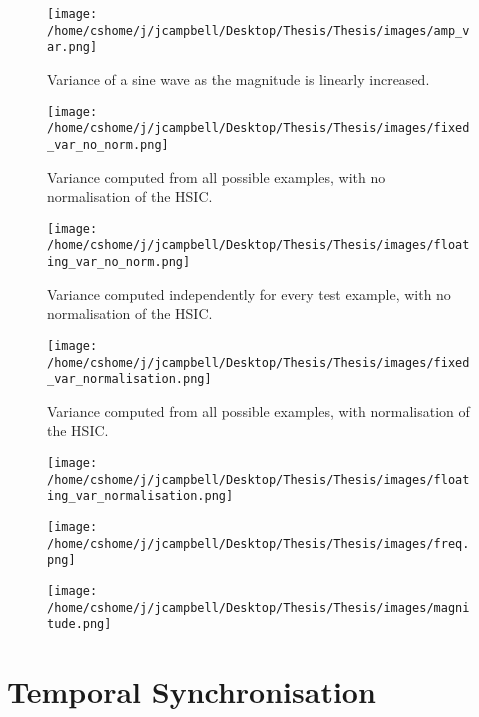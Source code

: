 \begin{figure}[h]
\texttt{[image: /home/cshome/j/jcampbell/Desktop/Thesis/Thesis/images/amp\_var.png]}
\caption{Variance of a sine wave as the magnitude is linearly increased.\label{amp_var}}
\end{figure}

\begin{figure}[h]
\texttt{[image: /home/cshome/j/jcampbell/Desktop/Thesis/Thesis/images/fixed\_var\_no\_norm.png]}
\caption{Variance computed from all possible examples, with no normalisation of the HSIC.\label{fixed_var_no_norm}}
\end{figure}

\begin{figure}[h]
\texttt{[image: /home/cshome/j/jcampbell/Desktop/Thesis/Thesis/images/floating\_var\_no\_norm.png]}
\caption{Variance computed independently for every test example, with no normalisation of the HSIC.\label{floating_var_no_norm}}
\end{figure}

\begin{figure}[h]
\texttt{[image: /home/cshome/j/jcampbell/Desktop/Thesis/Thesis/images/fixed\_var\_normalisation.png]}
\caption{Variance computed from all possible examples, with normalisation of the HSIC.\label{fixed_var_normalisation}}
\end{figure}

\begin{figure}[h]
\texttt{[image: /home/cshome/j/jcampbell/Desktop/Thesis/Thesis/images/floating\_var\_normalisation.png]}
\caption{\label{floating_var_normalisation}}
\end{figure}

\begin{figure}[h]
\texttt{[image: /home/cshome/j/jcampbell/Desktop/Thesis/Thesis/images/freq.png]}
\caption{\label{freq}}
\end{figure}

\begin{figure}[h]
\texttt{[image: /home/cshome/j/jcampbell/Desktop/Thesis/Thesis/images/magnitude.png]}
\caption{\label{magnitude}}
\end{figure}


\section{Temporal Synchronisation}

